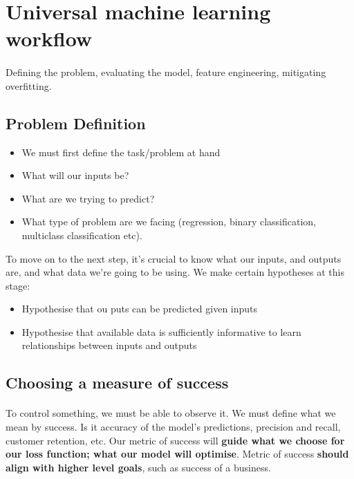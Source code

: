 \documentclass[12pt, a4paper]{article}
\begin{document}
\section{Universal machine learning workflow}
\paragraph*{}
Defining the problem, evaluating the model, feature engineering, mitigating overfitting.
\subsection{Problem Definition}
\begin{itemize}
   \item We must first define the task/problem at hand 
   \item What will our inputs be?
   \item What are we trying to predict?
   \item What type of problem are we facing (regression, binary classification, multiclass classification etc).
\end{itemize}
To move on to the next step, it's crucial to know what our inputs, and outputs are, and what data 
we're going to be using. We make certain hypotheses at this stage: 
\begin{itemize}
   \item Hypothesise that ou puts can be predicted given inputs
   \item Hypothesise that available data is sufficiently informative to learn relationships between inputs and outputs 
\end{itemize}


\subsection{Choosing a measure of success}
\paragraph*{}
To control something, we must be able to observe it. We must define what we 
mean by success. Is it accuracy of the model's predictions, precision and recall, customer retention, etc.
Our metric of success will \textbf{guide what we choose for our loss function; what our model will optimise}.
Metric of success \textbf{should align with higher level goals}, such as success of a business.
\end{document}
